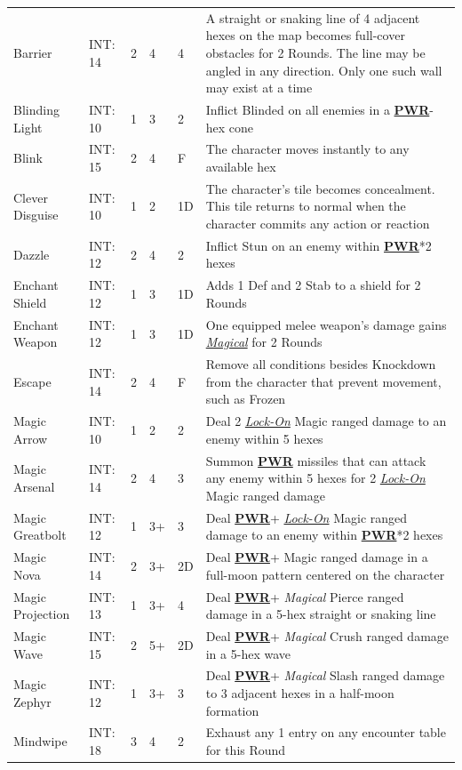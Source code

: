 \documentclass[12pt]{article}
\newcommand{\refto}[1]{\hyperlink{#1}{\textbf{#1}}}
\newcommand{\reftoit}[1]{\hyperlink{#1}{\emph{#1}}}
\begin{document}
\begin{center}
\begin{tabularx}{\textwidth}{p{}p{}p{}p{}p{}p{}}
Barrier & INT: 14 & 2 & 4 & 4 & A straight or snaking line of 4 adjacent hexes on the map becomes full-cover obstacles for 2 Rounds. The line may be angled in any direction. Only one such wall may exist at a time\\
Blinding Light & INT: 10 & 1 & 3 & 2 & Inflict Blinded on all enemies in a \refto{PWR}-hex cone\\
Blink & INT: 15 & 2 & 4 & F & The character moves instantly to any available hex \\
Clever Disguise & INT: 10 & 1 & 2 & 1D & The character’s tile becomes concealment. This tile returns to normal when the character commits any action or reaction\\
Dazzle & INT: 12 & 2 & 4 & 2 & Inflict Stun on an enemy within \refto{PWR}*2 hexes \\
Enchant Shield & INT: 12 & 1 & 3 & 1D & Adds 1 Def and 2 Stab to a shield for 2 Rounds \\
Enchant Weapon & INT: 12 & 1 & 3 & 1D & One equipped melee weapon’s damage gains \reftoit{Magical} for 2 Rounds \\
Escape & INT: 14 & 2 & 4 & F & Remove all conditions besides Knockdown from the character that prevent movement, such as Frozen \\
Magic Arrow & INT: 10 & 1 & 2 & 2 & Deal 2 \reftoit{Lock-On} Magic ranged damage to an enemy within 5 hexes\\
Magic Arsenal & INT: 14 & 2 & 4 & 3 & Summon \refto{PWR} missiles that can attack any enemy within 5 hexes for 2 \reftoit{Lock-On} Magic ranged damage \\
Magic Greatbolt & INT: 12 & 1 & 3+ & 3 & Deal \refto{PWR}+ \reftoit{Lock-On} Magic ranged damage to an enemy within \refto{PWR}*2 hexes\\
Magic Nova & INT: 14 & 2 & 3+ & 2D & Deal \refto{PWR}+ Magic ranged damage in a full-moon pattern centered on the character\\
Magic Projection & INT: 13 & 1 & 3+ & 4 & Deal \refto{PWR}+ \emph{Magical} Pierce ranged damage in a 5-hex straight or snaking line \\
Magic Wave & INT: 15 & 2 & 5+ & 2D & Deal \refto{PWR}+ \emph{Magical} Crush ranged damage in a 5-hex wave \\
Magic Zephyr & INT: 12 & 1 & 3+ & 3 & Deal \refto{PWR}+ \emph{Magical} Slash ranged damage to 3 adjacent hexes in a half-moon formation\\
Mindwipe & INT: 18 & 3 & 4 & 2 & Exhaust any 1 entry on any encounter table for this Round\\
\hline
\end{tabularx}
\end{center}
\end{document}
